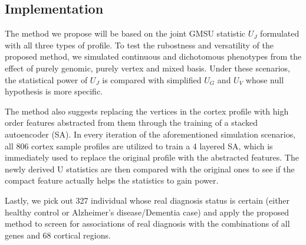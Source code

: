 \subsection{Implementation}
The method we propose will be based on the joint GMSU statistic $U_J$ formulated with all three types of profile. To test the rubostness and versatility of the proposed method, we simulated continuous and dichotomous phenotypes from the effect of purely genomic, purely vertex and mixed basis. Under these scenarios, the statistical power of $U_J$ is compared with simplified $U_G$ and $U_V$ whose null hypothesis is more specific.

The method also suggests replacing the vertices in the cortex profile with high order features abstracted from them through the training of a stacked autoencoder (SA). In every iteration of the aforementioned simulation scenarios, all 806 cortex sample profiles are utilized to train a 4 layered SA, which is immediately used to replace the original profile with the abstracted features. The newly derived U statistics are then compared with the original ones to see if the compact feature actually helps the statistics to gain power.

Lastly, we pick out 327 individual whose real diagnosis status is certain (either healthy control or Alzheimer's disease/Dementia case) and apply the proposed method to screen for associations of real diagnosis with the combinations of all genes and 68 cortical regions.